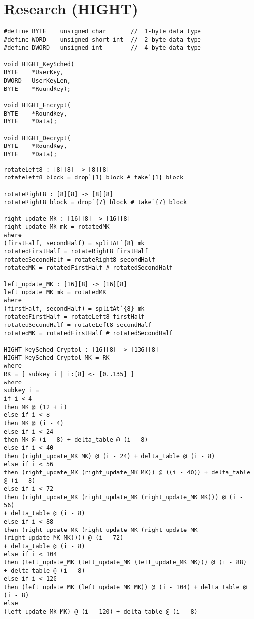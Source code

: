 \chapter{Research (HIGHT)}

\begin{lstlisting}
#define BYTE    unsigned char       //  1-byte data type
#define WORD    unsigned short int  //  2-byte data type
#define DWORD   unsigned int        //  4-byte data type	

void HIGHT_KeySched(
BYTE    *UserKey,       
DWORD   UserKeyLen,     
BYTE    *RoundKey);     

void HIGHT_Encrypt(
BYTE    *RoundKey,      
BYTE    *Data);         

void HIGHT_Decrypt(
BYTE    *RoundKey,      
BYTE    *Data); 
\end{lstlisting}

\newpage
\begin{lstlisting}
rotateLeft8 : [8][8] -> [8][8]
rotateLeft8 block = drop`{1} block # take`{1} block

rotateRight8 : [8][8] -> [8][8]
rotateRight8 block = drop`{7} block # take`{7} block

right_update_MK : [16][8] -> [16][8]
right_update_MK mk = rotatedMK
where
(firstHalf, secondHalf) = splitAt`{8} mk
rotatedFirstHalf = rotateRight8 firstHalf
rotatedSecondHalf = rotateRight8 secondHalf
rotatedMK = rotatedFirstHalf # rotatedSecondHalf

left_update_MK : [16][8] -> [16][8]
left_update_MK mk = rotatedMK
where
(firstHalf, secondHalf) = splitAt`{8} mk
rotatedFirstHalf = rotateLeft8 firstHalf
rotatedSecondHalf = rotateLeft8 secondHalf
rotatedMK = rotatedFirstHalf # rotatedSecondHalf

HIGHT_KeySched_Cryptol : [16][8] -> [136][8]
HIGHT_KeySched_Cryptol MK = RK
where
RK = [ subkey i | i:[8] <- [0..135] ]
where
subkey i = 
if i < 4
then MK @ (12 + i)
else if i < 8
then MK @ (i - 4)
else if i < 24
then MK @ (i - 8) + delta_table @ (i - 8)
else if i < 40
then (right_update_MK MK) @ (i - 24) + delta_table @ (i - 8)
else if i < 56
then (right_update_MK (right_update_MK MK)) @ ((i - 40)) + delta_table @ (i - 8)
else if i < 72
then (right_update_MK (right_update_MK (right_update_MK MK))) @ (i - 56)
+ delta_table @ (i - 8)
else if i < 88
then (right_update_MK (right_update_MK (right_update_MK (right_update_MK MK)))) @ (i - 72)
+ delta_table @ (i - 8)
else if i < 104
then (left_update_MK (left_update_MK (left_update_MK MK))) @ (i - 88) 
+ delta_table @ (i - 8)
else if i < 120
then (left_update_MK (left_update_MK MK)) @ (i - 104) + delta_table @ (i - 8)
else
(left_update_MK MK) @ (i - 120) + delta_table @ (i - 8)
\end{lstlisting}